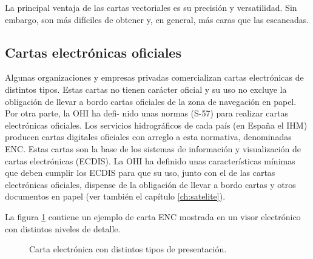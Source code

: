 La principal ventaja de las cartas vectoriales es su precisión y versatilidad. Sin 
embargo, son más difíciles de obtener y, en general, más caras que las escaneadas.

\subsection{Cartas electrónicas oficiales}
 
Algunas organizaciones y empresas privadas comercializan cartas electrónicas de distintos 
tipos. Estas cartas no tienen carácter oficial y su uso no excluye la obligación de llevar a 
bordo cartas oficiales de la zona de navegación en papel. Por otra parte, la OHI ha defi- 
nido unas normas (S-57) para realizar cartas electrónicas oficiales. Los servicios 
hidrográficos de cada país (en España el IHM) producen cartas digitales oficiales con arreglo a esta 
normativa, denominadas ENC. Estas cartas son la base de los sistemas de información y 
visualización de cartas electrónicas (ECDIS). La OHI ha definido unas características 
mínimas que deben cumplir los ECDIS para que su uso, junto con el de las cartas electrónicas oficiales, dispense de la obligación de llevar a bordo cartas y otros documentos en 
papel (ver también el capítulo \ref{ch:satelite}). 

La figura \ref{fg:ENC} contiene un ejemplo de carta ENC mostrada en un visor electrónico con 
distintos niveles de detalle. 

\begin{figure}[htbp]
\begin{center}
\caption{ Carta electrónica con distintos tipos de presentación.}
\label{fg:ENC}
\end{center}
\end{figure}

